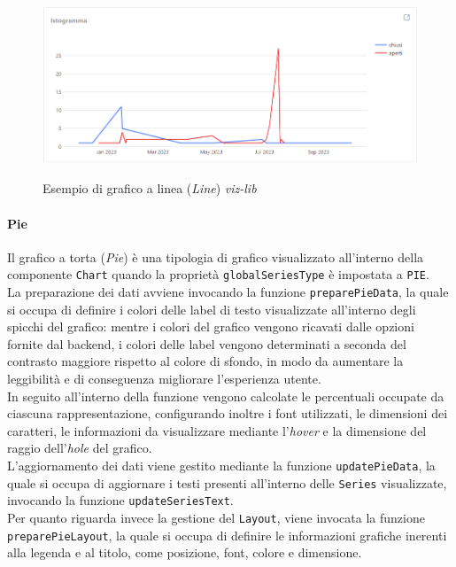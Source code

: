 \begin{figure}[H]
    \centering
    \includegraphics[alt={Esempio di grafico a linea viz-lib}, width=1 \columnwidth, height=\maxdimen, keepaspectratio]{img/ex_line.png}
    \caption{Esempio di grafico a linea (\textit{Line}) \textit{viz-lib}}
    \label{fig:line-example}
\end{figure}

\paragraph{Pie}
Il grafico a torta (\textit{Pie}) è una tipologia di grafico visualizzato all'interno della componente \texttt{Chart} quando la proprietà \texttt{globalSeriesType} è impostata a \texttt{PIE}. \\
La preparazione dei dati avviene invocando la funzione \texttt{preparePieData}, la quale si occupa di definire i colori delle label di testo visualizzate all'interno degli spicchi del grafico: mentre
i colori del grafico vengono ricavati dalle opzioni fornite dal backend, i colori delle label vengono determinati a seconda del contrasto maggiore rispetto al colore di sfondo, in modo da aumentare
la leggibilità e di conseguenza migliorare l'esperienza utente. \\
In seguito all'interno della funzione vengono calcolate le percentuali occupate da ciascuna rappresentazione, configurando inoltre i font utilizzati, le dimensioni dei caratteri, le informazioni da visualizzare
mediante l'\textit{hover} e la dimensione del raggio dell'\textit{hole} del grafico. \\
L'aggiornamento dei dati viene gestito mediante la funzione \texttt{updatePieData}, la quale si occupa di aggiornare i testi presenti all'interno delle \texttt{Series} visualizzate, invocando la funzione
\texttt{updateSeriesText}. \\
Per quanto riguarda invece la gestione del \texttt{Layout}, viene invocata la funzione \\
\texttt{preparePieLayout}, la quale si occupa di definire le informazioni grafiche inerenti alla legenda e al titolo,
come posizione, font, colore e dimensione.

